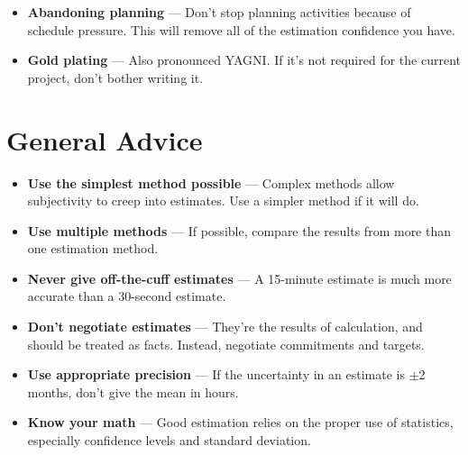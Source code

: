 \documentclass[11pt]{article}
\begin{document}
\begin{itemize}
\item {\bf Abandoning planning} --- Don't stop planning activities because of schedule pressure.
  This will remove all of the estimation confidence you have.
\item {\bf Gold plating} --- Also pronounced YAGNI.  If it's not required for the current project,
  don't bother writing it.
\end{itemize}

\section{General Advice}

\begin{itemize}
\item {\bf Use the simplest method possible} --- Complex methods allow subjectivity to creep into
  estimates.  Use a simpler method if it will do.
\item {\bf Use multiple methods} --- If possible, compare the results from more than one estimation
  method.
\item {\bf Never give off-the-cuff estimates} --- A 15-minute estimate is much more accurate than a
  30-second estimate.
\item {\bf Don't negotiate estimates} --- They're the results of calculation, and should be treated
  as facts.  Instead, negotiate commitments and targets.
\item {\bf Use appropriate precision} --- If the uncertainty in an estimate is $\pm$2 months, don't
  give the mean in hours.
\item {\bf Know your math} --- Good estimation relies on the proper use of statistics, especially
  confidence levels and standard deviation.
\end{itemize}
\end{document}
